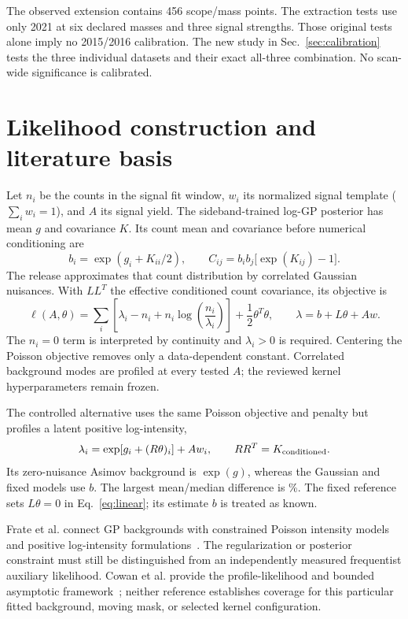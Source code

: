 \documentclass[11pt]{article}
\begin{document}
The observed extension contains 456 scope/mass points. The extraction tests
use only 2021 at six declared masses and three signal strengths. Those original tests alone imply no 2015/2016 calibration. The new study in Sec.~\ref{sec:calibration} tests the three individual datasets and their exact all-three combination. No scan-wide significance is calibrated.

\clearpage
\section{Likelihood construction and literature basis}

Let $n_i$ be the counts in the signal fit window, $w_i$ its normalized signal
template ($\sum_i w_i=1$), and $A$ its signal yield. The sideband-trained
log-GP posterior has mean $g$ and covariance $K$. Its count mean and covariance
before numerical conditioning are
\begin{equation}
 b_i=\exp(g_i+K_{ii}/2),\qquad
 C_{ij}=b_i b_j\bigl[\exp(K_{ij})-1\bigr].
\end{equation}
The release approximates that count distribution by correlated Gaussian
nuisances. With $LL^T$ the effective conditioned count covariance, its objective is
\begin{equation}
 \ell(A,\theta)=\sum_i\left[\lambda_i-n_i+
 n_i\log\!\left(\frac{n_i}{\lambda_i}\right)\right]
 +\frac12\theta^T\theta,\qquad
 \lambda=b+L\theta+Aw .\label{eq:linear}
\end{equation}
The $n_i=0$ term is interpreted by continuity and $\lambda_i>0$ is required.
Centering the Poisson objective removes only a data-dependent constant.
Correlated background modes are profiled at every tested $A$; the reviewed
kernel hyperparameters remain frozen.

The controlled alternative uses the same Poisson objective and penalty but
profiles a latent positive log-intensity,
\begin{equation}
 \lambda_i=\exp\!\left[g_i+(R\theta)_i\right]+Aw_i,
 \qquad RR^T=K_{\rm conditioned}.\label{eq:log}
\end{equation}
Its zero-nuisance Asimov background is $\exp(g)$, whereas the Gaussian and
fixed models use $b$. The largest mean/median difference is
\MeanMedianMax\%. The fixed reference sets $L\theta=0$ in
Eq.~\eqref{eq:linear}; its estimate $b$ is treated as known.

Frate et al. connect GP backgrounds with constrained Poisson intensity models
and positive log-intensity formulations~\cite{frate}. The regularization or
posterior constraint must still be distinguished from an independently
measured frequentist auxiliary likelihood. Cowan et al. provide the
profile-likelihood and bounded asymptotic framework~\cite{cowan}; neither
reference establishes coverage for this particular fitted background,
moving mask, or selected kernel configuration.
\end{document}
